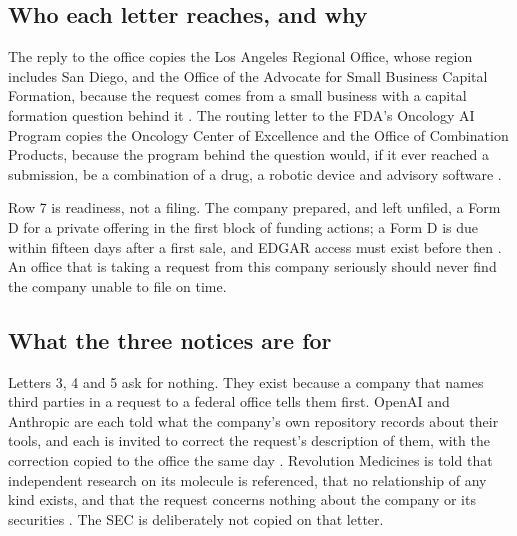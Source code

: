 \subsection{Who each letter reaches, and why}

The reply to the office copies the Los Angeles Regional Office, whose region
includes San Diego, and the Office of the Advocate for Small Business Capital
Formation, because the request comes from a small business with a capital
formation question behind it \cite{secregional2026,secoasb2026}. The routing
letter to the FDA's Oncology AI Program copies the Oncology Center of Excellence
and the Office of Combination Products, because the program behind the question
would, if it ever reached a submission, be a combination of a drug, a robotic
device and advisory software \cite{fdaoceai2026,fdaoce2026,fdacombination2026}.

Row 7 is readiness, not a filing. The company prepared, and left unfiled, a Form
D for a private offering in the first block of funding actions; a Form D is due
within fifteen days after a first sale, and EDGAR access must exist before then
\cite{secformd2026,secformid2026}. An office that is taking a request from this
company seriously should never find the company unable to file on time.

\subsection{What the three notices are for}

Letters 3, 4 and 5 ask for nothing. They exist because a company that names
third parties in a request to a federal office tells them first. OpenAI and
Anthropic are each told what the company's own repository records about their
tools, and each is invited to correct the request's description of them, with
the correction copied to the office the same day
\cite{tripartisan2026,anthropicnews2026}.
Revolution Medicines is told that independent research on its molecule is
referenced, that no relationship of any kind exists, and that the request
concerns nothing about the company or its securities \cite{revmedapproval2026}.
The SEC is deliberately not copied on that letter.

